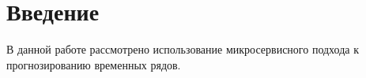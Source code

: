 \chapter*{Введение}
\label{sec:afterwords}

В данной работе рассмотрено использование микросервисного подхода к прогнозированию временных рядов. 

